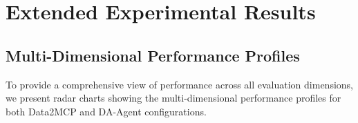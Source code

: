 %
%

\section{Extended Experimental Results}
\label{app:extended_results}
\FloatBarrier

\subsection{Multi-Dimensional Performance Profiles}
\label{app:profiles}

To provide a comprehensive view of performance across all evaluation dimensions, we present radar charts showing the multi-dimensional performance profiles for both Data2MCP and DA-Agent configurations.

